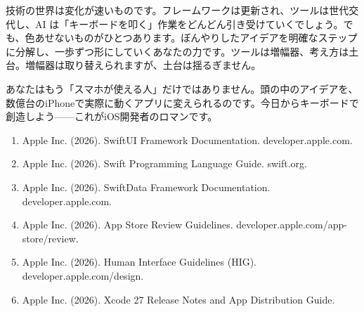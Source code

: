 技術の世界は変化が速いものです。フレームワークは更新され、ツールは世代交代し、AI は「キーボードを叩く」作業をどんどん引き受けていくでしょう。でも、色あせないものがひとつあります。ぼんやりしたアイデアを明確なステップに分解し、一歩ずつ形にしていくあなたの力です。ツールは増幅器、考え方は土台。増幅器は取り替えられますが、土台は揺るぎません。

あなたはもう「スマホが使える人」だけではありません。頭の中のアイデアを、数億台のiPhoneで実際に動くアプリに変えられるのです。今日からキーボードで創造しよう——これがiOS開発者のロマンです。


\begin{enumerate}
  \item Apple Inc. (2026). SwiftUI Framework Documentation. developer.apple.com.
  \item Apple Inc. (2026). Swift Programming Language Guide. swift.org.
  \item Apple Inc. (2026). SwiftData Framework Documentation. developer.apple.com.
  \item Apple Inc. (2026). App Store Review Guidelines. developer.apple.com/app-store/review.
  \item Apple Inc. (2026). Human Interface Guidelines (HIG). developer.apple.com/design.
  \item Apple Inc. (2026). Xcode 27 Release Notes and App Distribution Guide.
\end{enumerate}
